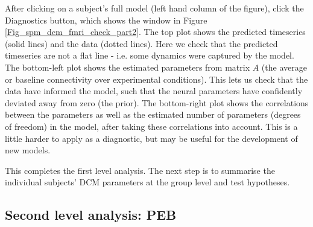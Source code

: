 \documentclass{article}
\begin{document}
After clicking on a subject's full model (left hand column of the figure), click the Diagnostics button, which shows the window in Figure \ref{Fig_spm_dcm_fmri_check_part2}. The top plot shows the predicted timeseries (solid lines) and the data (dotted lines). Here we check that the predicted timeseries are not a flat line - i.e. some dynamics were captured by the model. The bottom-left plot shows the estimated parameters from matrix \(A\) (the average or baseline connectivity over experimental conditions). This lets us check that the data have informed the model, such that the neural parameters have confidently deviated away from zero (the prior). The bottom-right plot shows the correlations between the parameters as well as the estimated number of parameters (degrees of freedom) in the model, after taking these correlations into account. This is a little harder to apply as a diagnostic, but may be useful for the development of new models.

This completes the first level analysis. The next step is to summarise the individual subjects' DCM parameters at the group level and test hypotheses.

\subsection{Second level analysis: PEB}
\end{document}
